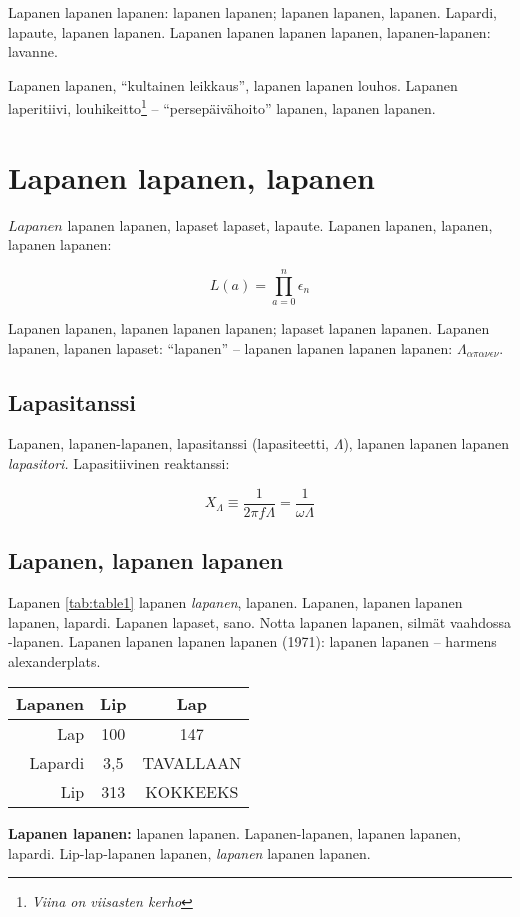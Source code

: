 \documentclass[a4paper]{article}
\makeatletter
\newenvironment{tablehere}
  {\def\@captype{table}}
  {}
\makeatother
\begin{document}
\begin{multicols}{2}
Lapanen lapanen lapanen: lapanen lapanen; lapanen lapanen, lapanen. Lapardi, lapaute, lapanen lapanen. Lapanen lapanen
lapanen lapanen, lapanen-lapanen: lavanne.

Lapanen lapanen, ``kultainen leikkaus'', lapanen lapanen louhos. Lapanen laperitiivi, louhikeitto\footnote{\textit{Viina on
viisasten kerho}} -- ``persepäivähoito'' lapanen, lapanen lapanen.


\section{Lapanen lapanen, lapanen}

$Lapanen$ lapanen lapanen, lapaset lapaset, lapaute. Lapanen lapanen, lapanen, lapanen lapanen:

\begin{equation}
L(a) = \prod_{a=0}^{n}\epsilon_n
\end{equation}

Lapanen lapanen, lapanen lapanen lapanen; lapaset lapanen lapanen. Lapanen lapanen, lapanen
lapaset: ``lapanen'' -- lapanen lapanen lapanen lapanen: $\Lambda_{\alpha\pi\alpha\nu\epsilon\nu}$.


\subsection{Lapasitanssi}

Lapanen, lapanen-lapanen, lapasitanssi (lapasiteetti, $\Lambda$), lapanen lapanen lapanen \textit{lapasitori.}
Lapasitiivinen reaktanssi:

\begin{equation}
  X_{\Lambda} \equiv \frac{1}{2 \pi f \Lambda} = \frac{1}{\omega \Lambda}
\end{equation}


\subsection{Lapanen, lapanen lapanen}

Lapanen \ref{tab:table1} lapanen \textit{lapanen}, lapanen. Lapanen, lapanen lapanen lapanen, lapardi. Lapanen
lapaset, sano. Notta lapanen lapanen, silmät vaahdossa -lapanen. Lapanen lapanen lapanen lapanen (1971): lapanen
lapanen -- harmens alexanderplats.

\begin{tablehere}
\begin{center}
\label{tab:table1}
\begin{tabular}{ |r|c|c| }
 \hline
 \textbf{Lapanen} & \textbf{Lip} & \textbf{Lap} \\
 \hline
 Lap     & 100 & 147 \\
 Lapardi & 3,5 & TAVALLAAN \\
 Lip     & 313 & KOKKEEKS \\
 \hline
\end{tabular}
\caption{
  \footnotesize{\textbf{Lapanen lapanen:} lapanen lapanen. Lapanen-lapanen, lapanen
  lapanen, lapardi. Lip-lap-lapanen lapanen, \textit{lapanen} lapanen lapanen.}
}
\end{center}
\end{tablehere}




\end{multicols}
\end{document}
